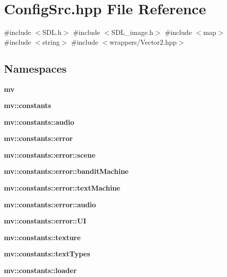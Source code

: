 \section{Config\+Src.\+hpp File Reference}
\label{_config_src_8hpp}
{\ttfamily \#include $<$S\+D\+L.\+h$>$}\newline
{\ttfamily \#include $<$S\+D\+L\+\_\+image.\+h$>$}\newline
{\ttfamily \#include $<$map$>$}\newline
{\ttfamily \#include $<$string$>$}\newline
{\ttfamily \#include $<$wrappers/\+Vector2.\+hpp$>$}\newline
\subsection*{Namespaces}
\begin{DoxyCompactItemize}
\item 
 \textbf{ mv}
\item 
 \textbf{ mv\+::constants}
\item 
 \textbf{ mv\+::constants\+::audio}
\item 
 \textbf{ mv\+::constants\+::error}
\item 
 \textbf{ mv\+::constants\+::error\+::scene}
\item 
 \textbf{ mv\+::constants\+::error\+::bandit\+Machine}
\item 
 \textbf{ mv\+::constants\+::error\+::text\+Machine}
\item 
 \textbf{ mv\+::constants\+::error\+::audio}
\item 
 \textbf{ mv\+::constants\+::error\+::\+UI}
\item 
 \textbf{ mv\+::constants\+::texture}
\item 
 \textbf{ mv\+::constants\+::text\+Types}
\item 
 \textbf{ mv\+::constants\+::loader}
\end{DoxyCompactItemize}
